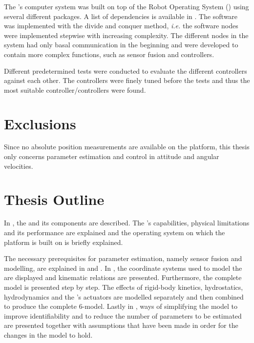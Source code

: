 The \abbrROV's computer system was built on top of the Robot Operating System (\abbrROS) using several different packages. A list of dependencies is available in . The software was implemented with the divide and conquer method, \textit{i.e.} the software nodes were implemented stepwise with increasing complexity. The different nodes in the system had only basal communication in the beginning and were developed to contain more complex functions, such as sensor fusion and controllers. 

Different predetermined tests were conducted to evaluate the different controllers against each other. The controllers were finely tuned before the tests and thus the most suitable controller/controllers were found.


\section{Exclusions}
Since no absolute position measurements are available on the \abbrROV platform, this thesis only concerns parameter estimation and control in attitude and angular velocities.%
\section{Thesis Outline}
In , the \abbrROV and its components are described. The \abbrROV's capabilities, physical limitations and its performance are explained and the operating system on which the \abbrROV platform is built on is briefly explained.

The necessary prerequisites for parameter estimation, namely sensor fusion and modelling, are explained in  and . In , the coordinate systems used to model the \abbrROV are displayed and kinematic relations are presented. Furthermore, the complete \abbrROV model is presented step by step. The effects of rigid-body kinetics, hydrostatics, hydrodynamics and the \abbrROV's actuators are modelled separately and then combined to produce the complete 6-\abbrDOF model. 
Lastly in , ways of simplifying the model to improve identifiability and to reduce the number of parameters to be estimated are presented together with assumptions that have been made in order for the changes in the model to hold. 

